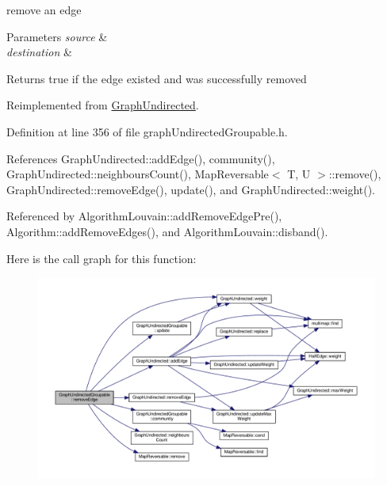 remove an edge


\begin{DoxyParams}{Parameters}
{\em source} & \\
\hline
{\em destination} & \\
\hline
\end{DoxyParams}
\begin{DoxyReturn}{Returns}
true if the edge existed and was successfully removed 
\end{DoxyReturn}


Reimplemented from \hyperlink{classGraphUndirected_af4a40541132a66c9b688a20958057751}{Graph\+Undirected}.



Definition at line 356 of file graph\+Undirected\+Groupable.\+h.



References Graph\+Undirected\+::add\+Edge(), community(), Graph\+Undirected\+::neighbours\+Count(), Map\+Reversable$<$ T, U $>$\+::remove(), Graph\+Undirected\+::remove\+Edge(), update(), and Graph\+Undirected\+::weight().



Referenced by Algorithm\+Louvain\+::add\+Remove\+Edge\+Pre(), Algorithm\+::add\+Remove\+Edges(), and Algorithm\+Louvain\+::disband().

Here is the call graph for this function\+:
\nopagebreak
\begin{figure}[H]
\begin{center}
\leavevmode
\includegraphics[width=350pt]{classGraphUndirectedGroupable_ad1a488cc292d7e63d289f598aeaaacd6_cgraph}
\end{center}
\end{figure}
\mbox{\label{classGraphUndirectedGroupable_a88e02e4e05f304b289558922f1cb6aa1}} 
